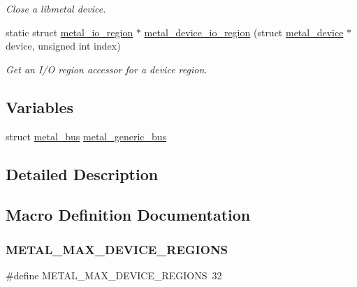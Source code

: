 \begin{DoxyCompactItemize}
\begin{DoxyCompactList}\small\item\em Close a libmetal device. \end{DoxyCompactList}\item 
static struct \hyperlink{structmetal__io__region}{metal\+\_\+io\+\_\+region} $\ast$ \hyperlink{group__device_ga56d60dddbc504796daa708e182b83255}{metal\+\_\+device\+\_\+io\+\_\+region} (struct \hyperlink{structmetal__device}{metal\+\_\+device} $\ast$device, unsigned int index)
\begin{DoxyCompactList}\small\item\em Get an I/O region accessor for a device region. \end{DoxyCompactList}\end{DoxyCompactItemize}
\subsection*{Variables}
\begin{DoxyCompactItemize}
\item 
struct \hyperlink{structmetal__bus}{metal\+\_\+bus} \hyperlink{group__device_gab25f549ea3a9151e82c033dd219bbfe5}{metal\+\_\+generic\+\_\+bus}
\end{DoxyCompactItemize}


\subsection{Detailed Description}


\subsection{Macro Definition Documentation}
\mbox{\label{group__device_gade1e205242a3d9e8ec25535d263aa664}} 
\subsubsection{\texorpdfstring{M\+E\+T\+A\+L\+\_\+\+M\+A\+X\+\_\+\+D\+E\+V\+I\+C\+E\+\_\+\+R\+E\+G\+I\+O\+NS}{METAL\_MAX\_DEVICE\_REGIONS}}
{\footnotesize\ttfamily \#define M\+E\+T\+A\+L\+\_\+\+M\+A\+X\+\_\+\+D\+E\+V\+I\+C\+E\+\_\+\+R\+E\+G\+I\+O\+NS~32}



